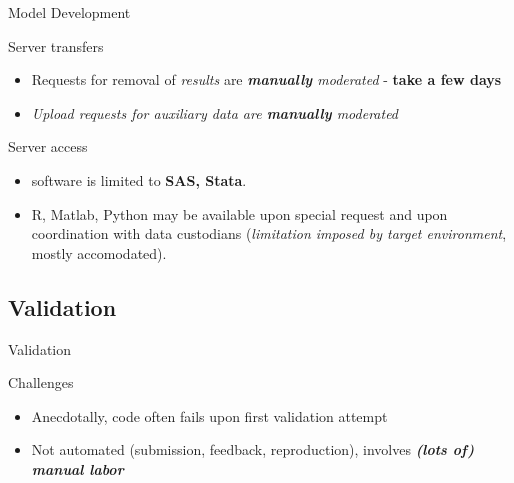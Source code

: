 \begin{frame}{Model Development}
\scalebox{0.1}{\myworkflow}
\begin{block}{Server transfers}
	\begin{itemize}
		\item Requests for removal of \textit{results} are \textit{\color{orange} \textbf{manually} moderated} - \textbf{take a few days}
		\item  {\it \color{orange}Upload requests for auxiliary data are \textbf{manually} moderated} 
	\end{itemize}
\end{block}\pause

\begin{block}{Server access}
	\begin{itemize}
		\item software is limited to \textbf{SAS, Stata}. 
		\item R, Matlab, Python may be available upon special request and upon coordination with data custodians ({\it \color{orange}limitation imposed by target environment}, mostly accomodated). 
	\end{itemize}
\end{block}
\end{frame}



\subsection{Validation}

\begin{frame}{Validation}
\scalebox{0.1}{\myworkflow}
\scalebox{0.6}{
\flowvalidation{}
}

\begin{block}{Challenges}
	\begin{itemize}
		\item Anecdotally, code often fails upon first validation attempt  
		\item Not automated (submission, feedback, reproduction), involves {\it \bf \color{orange}(lots of) manual labor}
	\end{itemize}
\end{block}

\end{frame}


